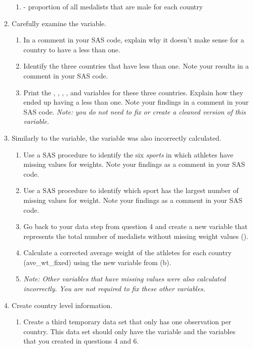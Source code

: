 \begin{enumerate}
\begin{enumerate}
\item[]   - proportion of all medalists that are male for each country
\end{enumerate}
\item Carefully examine the  variable.
\begin{enumerate}
\item In a comment in your SAS code, explain why it doesn't make sense for a country to have a  less than one.
\item Identify the three countries that have  less than one.  Note your results in a comment in your SAS code.
\item Print the , , , ,  and  variables  for these three countries.  Explain how they ended up having a  less than one.  Note your findings in a comment in your SAS code. \emph{Note: you do not need to fix or create a cleaned version of this variable.}
\end{enumerate}
\item Similarly to the   variable, the  variable was also incorrectly calculated.
\begin{enumerate}
\item Use a SAS procedure to identify the six \emph{sports} in which athletes have missing values for weights.  Note your findings as a comment in your SAS code.
\item Use a SAS procedure to identify which sport has the largest number of missing values for weight.  Note your findings as a comment in your SAS code.
\item Go back to your data step from question 4 and create a new variable that represents the total number of medalists without missing weight values ().
\item Calculate a corrected average weight of the athletes for each country (ave\_wt\_fixed) using the new variable from (b).
\item[]\emph{Note: Other variables that have missing values were also calculated incorrectly.  You are not required to fix these other variables.}
\end{enumerate}
\item
Create country level information.
\begin{enumerate}
\item  Create a third temporary data set that only has one observation per country.  This data set should only have the variable  and the variables that you created in questions 4 and 6.

\end{enumerate}
\end{enumerate}
